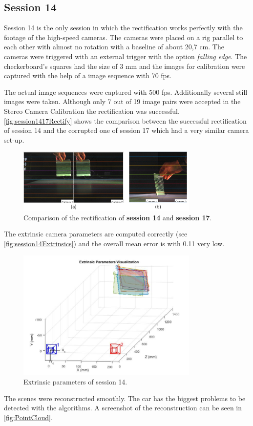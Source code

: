 \subsection{Session 14}\label{ssec:Session14}
Session 14 is the only session in which the rectification works perfectly with the footage of the high-speed cameras. The cameras were placed on a rig parallel to each other with almost no rotation with a baseline of about 20,7 cm. The cameras were triggered with an external trigger with the option \textit{falling edge}. The checkerboard's squares had the size of 3 mm and the images for calibration were captured with the help of a image sequence with 70 fps.

The actual image sequences were captured with 500 fps. Additionally several still images were taken. Although only 7 out of 19 image pairs were accepted in the Stereo Camera Calibration the rectification was successful. \autoref{fig:session1417Rectify} shows the comparison between the successful rectification of session 14 and the corrupted one of session 17 which had a very similar camera set-up.

\begin{figure}[htbp]
		\centering
		\includegraphics[width=0.8\textwidth]{figures/RectifyCompared}
		\caption[Comparison of the rectification of session 14 and 17]{Comparison of the rectification of \textbf{session 14} and \textbf{session 17}.}
		\label{fig:session1417Rectify}
\end{figure}

The extrinsic camera parameters are computed correctly (see \autoref{fig:session14Extrinsics}) and the overall mean error is with 0.11 very low.

\begin{figure}[htbp]
		\centering
		\includegraphics[width=0.8\textwidth]{figures/ExtrinsicParams}
		\caption[Extrinsic parameters of session 14]{Extrinsic parameters of session 14.}
		\label{fig:session14Extrinsics}
\end{figure}

The scenes were reconstructed smoothly. The car has the biggest problems to be detected with the algorithms. A screenshot of the reconstruction can be seen in \autoref{fig:PointCloud}.